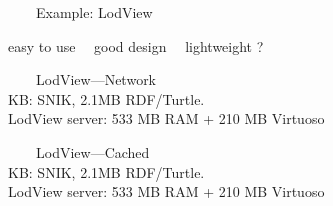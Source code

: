 \documentclass[14pt,aspectratio=169]{beamer}
\newcommand{\cmark}{\ding{51}}%
\newcommand{\xmark}{\ding{55}}%
\newcommand{\imageslide}[4][]
{
\begin{frame}[plain]{~~~~#2}
\vspace{0.2em}
\centering\makebox[\linewidth]{\texttt{[image: \#3]}}
\\#1
\note{#4}
\end{frame}
}
\begin{document}
\begin{frame}[plain]{~~~~Example: LodView}

\vspace{0.2em}
\centering{}
\footnotesize
easy to use \cmark{}~~good design \cmark{}~~lightweight ?
%
\end{frame}

\imageslide[KB: SNIK, 2.1MB RDF/Turtle.\\LodView server: 533 MB RAM + 210 MB Virtuoso]{LodView---Network}{img/lodview-nocache.png}{}
\imageslide[KB: SNIK, 2.1MB RDF/Turtle.\\LodView server: 533 MB RAM + 210 MB Virtuoso]{LodView---Cached}{img/lodview-cache.png}{}
\end{document}
